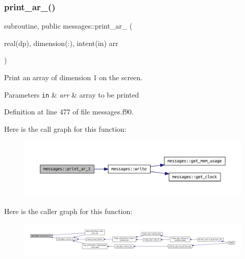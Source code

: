 \subsubsection{\texorpdfstring{print\+\_\+ar\+\_()}{print\_ar\_1()}}
{\footnotesize\ttfamily subroutine, public messages\+::print\+\_\+ar\+\_ (\begin{DoxyParamCaption}\item[{real(dp), dimension(\+:), intent(in)}]{arr }\end{DoxyParamCaption})}



Print an array of dimension 1 on the screen. 


\begin{DoxyParams}[1]{Parameters}
\mbox{\tt in}  & {\em arr} & array to be printed \\
\hline
\end{DoxyParams}


Definition at line 477 of file messages.\+f90.

Here is the call graph for this function\+:
\nopagebreak
\begin{figure}[H]
\begin{center}
\leavevmode
\includegraphics[width=350pt]{namespacemessages_a5686118397930f505259225f3688216b_cgraph}
\end{center}
\end{figure}
Here is the caller graph for this function\+:
\nopagebreak
\begin{figure}[H]
\begin{center}
\leavevmode
\includegraphics[width=350pt]{namespacemessages_a5686118397930f505259225f3688216b_icgraph}
\end{center}
\end{figure}
\mbox{\label{namespacemessages_a80797cedef6112b8dccaeda431f0c610}} 

